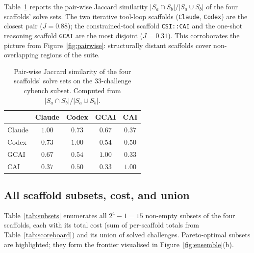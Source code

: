 Table~\ref{tab:jaccard} reports the pair-wise Jaccard similarity $|S_a \cap S_b|/|S_a \cup S_b|$ of the four scaffolds' solve sets. The two iterative tool-loop scaffolds (\texttt{Claude}, \texttt{Codex}) are the closest pair ($J=0.88$); the constrained-tool scaffold \texttt{CSI::CAI} and the one-shot reasoning scaffold \texttt{GCAI} are the most disjoint ($J=0.31$). This corroborates the picture from Figure~\ref{fig:pairwise}: structurally distant scaffolds cover non-overlapping regions of the suite.

\begin{table}[t]
\centering
\small
\setlength{\tabcolsep}{8pt}
\begin{tabular*}{\textwidth}{@{\extracolsep{\fill}}lcccc@{}}
\toprule
            & Claude & Codex & GCAI  & CAI   \\
\midrule
Claude      & $1.00$ & $0.73$ & $0.67$ & $0.37$ \\
Codex       & $0.73$ & $1.00$ & $0.54$ & $0.50$ \\
GCAI        & $0.67$ & $0.54$ & $1.00$ & $0.33$ \\
CAI         & $0.37$ & $0.50$ & $0.33$ & $1.00$ \\
\bottomrule
\end{tabular*}
\caption{Pair-wise Jaccard similarity of the four scaffolds' solve sets on the 33-challenge cybench subset. Computed from $|S_a \cap S_b|/|S_a \cup S_b|$.}\label{tab:jaccard}
\end{table}

\subsection{All scaffold subsets, cost, and union}\label{app:subsets}

Table~\ref{tab:subsets} enumerates all $2^{4}-1=15$ non-empty subsets of the four scaffolds, each with its total cost (sum of per-scaffold totals from Table~\ref{tab:scoreboard}) and its union of solved challenges. Pareto-optimal subsets are highlighted; they form the frontier visualised in Figure~\ref{fig:ensemble}(b).

